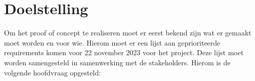 \section{Doelstelling}
\label{sec:Doelstelling}
Om het proof of concept te realiseren moet er eerst bekend zijn wat er gemaakt moet worden en voor wie.
Hierom moet er een lijst aan geprioriteerde requirements komen voor 22 november 2023 voor het  project.
Deze lijst moet worden samengesteld in samenwerking met de stakeholders. Hierom is de volgende hoofdvraag opgesteld:

\whitespace
\begin{center}
    \textit{\MainQuestion}
\end{center}
